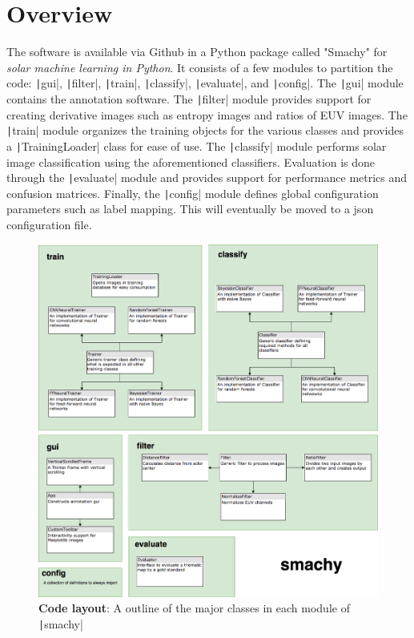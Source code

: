 \documentclass[twoside]{report}
\newcommand{\code}[1]{\texttt|#1|}
\begin{document}
\section{Overview}
The software is available via Github in a Python package called "Smachy" for \textit{solar machine learning in Python}. It consists of a few modules to partition the code: \code{gui}, \code{filter}, \code{train}, \code{classify}, \code{evaluate}, and \code{config}. The \code{gui} module contains the annotation software. The \code{filter} module provides support for creating derivative images such as entropy images and ratios of EUV images. The \code{train} module organizes the training objects for the various classes and provides a \code{TrainingLoader} class for ease of use. The \code{classify} module performs solar image classification using the aforementioned classifiers. Evaluation is done through the \code{evaluate} module and provides support for performance metrics and confusion matrices. Finally, the \code{config} module defines global configuration parameters such as label mapping. This will eventually be moved to a json configuration file. 

\begin{figure}[ht]
  \begin{center}
    \includegraphics[scale=0.35]{codebase}
    \caption{{\bf Code layout}: A outline of the major classes in each module of \code{smachy} }
    \label{fig:codebase}
 \end{center}
\end{figure}
\end{document}
